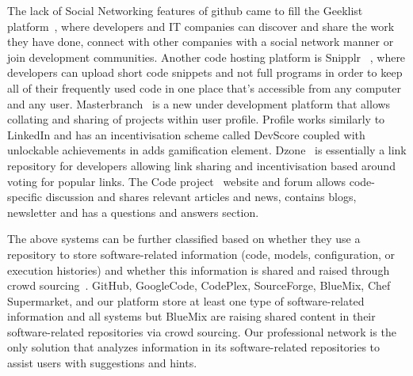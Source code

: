 The lack of Social Networking features of github came to fill the Geeklist platform~\cite{geeklist_url}, where developers and IT companies can discover and share the work they have done, connect with other companies with a social network manner or join development communities. Another code hosting platform is Snipplr ~\cite{Snipplr_url}, where developers can upload short code snippets and not full programs in order to keep all of their frequently used code in one place that's accessible from any computer and any user. Masterbranch~\cite{masterbranch_url} is a new under development platform that allows collating and sharing of projects within user profile. Profile works similarly to LinkedIn and has an incentivisation scheme called DevScore coupled with unlockable achievements in adds gamification element. Dzone~\cite{dzone_url} is essentially a link repository for developers allowing link sharing and incentivisation based around voting for popular links. The Code project~\cite{codeproject_url} website and forum allows code-specific discussion and shares relevant articles and news, contains blogs,  newsletter and has a questions and answers section.

The above systems can be further classified based on whether they use a repository to store software-related information (code, models, configuration, or execution histories) and whether this information is shared and raised through crowd sourcing~\cite{	howe2006rise}.  GitHub, GoogleCode, CodePlex, SourceForge, BlueMix, Chef Supermarket, and our platform store at least one type of software-related information and all systems but BlueMix are raising shared content in their software-related repositories via crowd sourcing. Our professional network is the only solution that analyzes information in its software-related repositories to assist users with suggestions and hints. 



